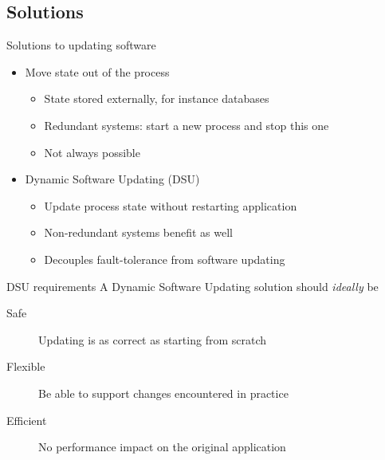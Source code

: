\subsection{Solutions}
\begin{frame}{Solutions to updating software}%
\begin{itemize}
\item Move state out of the process
  \begin{itemize}
  \item State stored externally, for instance databases
  \item Redundant systems: start a new process and stop this one
  \item Not always possible
  \end{itemize}
\item<2-> Dynamic Software Updating (DSU)
  \begin{itemize}
    \item Update process state without restarting application
    \item Non-redundant systems benefit as well
    \item Decouples fault-tolerance from software updating
  \end{itemize}
\end{itemize}
\end{frame}

\begin{frame}{DSU requirements}%
A Dynamic Software Updating solution should \emph{ideally} be
\begin{description}
\item[Safe] Updating is as correct as starting from scratch
\item[Flexible] Be able to support changes encountered in practice
\item[Efficient] No performance impact on the original application
\end{description}
\end{frame}

